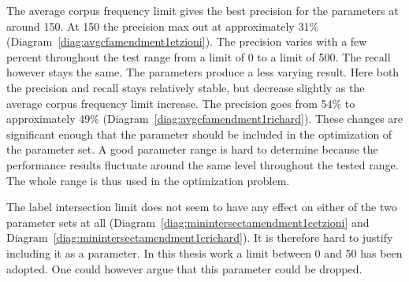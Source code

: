 The average corpus frequency limit gives the best precision for the \citeauthor{Oren1998} parameters at around 150. At 150 the precision max out at approximately 31\% (Diagram~\ref{diag:avgcfamendment1etzioni}). The precision varies with a few percent throughout the test range from a limit of 0 to a limit of 500. The recall however stays the same. The \citeauthor{Moe2014compact} parameters produce a less varying result. Here both the precision and recall stays relatively stable, but decrease slightly as the average corpus frequency limit increase. The precision goes from 54\% to approximately 49\% (Diagram~\ref{diag:avgcfamendment1richard}). These changes are significant enough that the parameter should be included in the optimization of the parameter set. A good parameter range is hard to determine because the performance results fluctuate around the same level throughout the tested range. The whole range is thus used in the optimization problem.

The label intersection limit does not seem to have any effect on either of the two parameter sets at all (Diagram~\ref{diag:minintersectamendment1cetzioni} and Diagram~\ref{diag:minintersectamendment1crichard}). It is therefore hard to justify including it as a parameter. In this thesis work a limit between 0 and 50 has been adopted. One could however argue that this parameter could be dropped.

